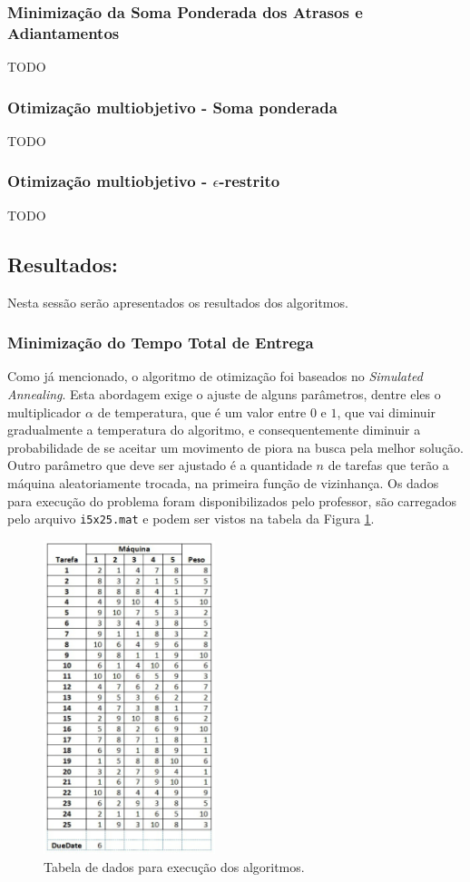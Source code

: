 \documentclass[conference]{IEEEtran}
\begin{document}
\subsubsection{Minimização da Soma Ponderada dos Atrasos e Adiantamentos}
TODO

\subsubsection{Otimização multiobjetivo - Soma ponderada}
TODO

\subsubsection{Otimização multiobjetivo - $\epsilon$-restrito}
TODO

\subsection{Resultados:}
Nesta sessão serão apresentados os resultados dos algoritmos.
\subsubsection{Minimização do Tempo Total de Entrega}
Como já mencionado, o algoritmo de otimização foi baseados no \textit{Simulated Annealing}. Esta abordagem exige o ajuste de alguns parâmetros, dentre eles o multiplicador $\alpha$ de temperatura, que é um valor entre $0$ e $1$, que vai diminuir gradualmente a temperatura do algoritmo, e consequentemente diminuir a probabilidade de se aceitar um movimento de piora na busca pela melhor solução. Outro parâmetro que deve ser ajustado é a quantidade $n$ de tarefas que terão a máquina aleatoriamente trocada, na primeira função de vizinhança. Os dados para execução do problema foram disponibilizados pelo professor, são carregados pelo arquivo \texttt{i5x25.mat} e podem ser vistos na tabela da Figura \ref{fig:tabela-dados}.

	\begin{figure}[h]
		\centering
		\includegraphics[width=5cm]{img/tabela-dados.png}
		\caption{Tabela de dados para execução dos algoritmos.}
		\label{fig:tabela-dados}
	\end{figure}
\end{document}
